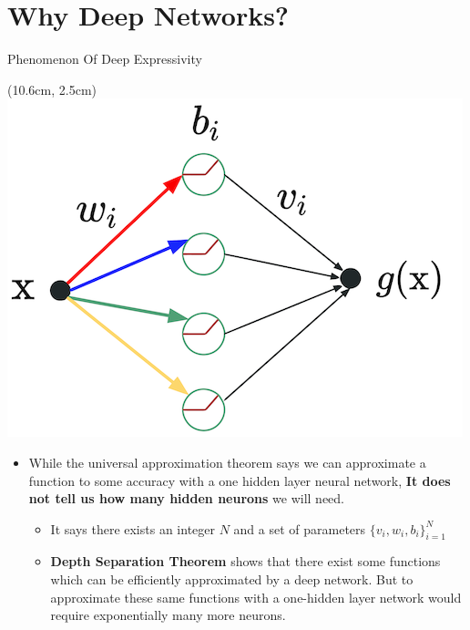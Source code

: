 \documentclass[serif, aspectratio=169]{beamer}
\begin{document}
\section{Why Deep Networks?}
\begin{frame}{Phenomenon Of Deep Expressivity}
	\begin{textblock*}{5cm}(10.6cm, 2.5cm)
		\includegraphics[keepaspectratio, scale=0.3]{pic/mlp}
	\end{textblock*}
	
	\begin{itemize}
		\item While the universal approximation theorem says \newline we can approximate a function to some accuracy \newline with a one hidden layer neural network, \textbf{It does not \newline tell us how many hidden neurons} we will need.
		\begin{itemize}
			\item It says there exists an integer $N$ and a set of \newline parameters $\{v_i,w_i,b_i\}_{i=1}^N$
			\item \textbf{Depth Separation Theorem} shows that there exist \newline some functions which can be efficiently approximated \newline by a deep network. But to approximate these same \newline functions with a one-hidden layer network would require \newline exponentially many more neurons.
		\end{itemize}
		
	\end{itemize}
\end{frame}
\end{document}
